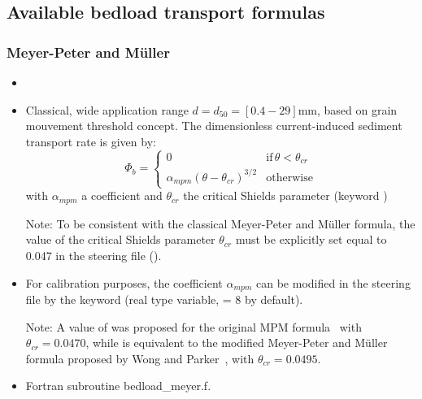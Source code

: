 \subsection{Available bedload transport formulas}
\subsubsection{Meyer-Peter and M\"uller}
\begin{itemize}
\item {}
\item Classical, wide application range $d=d_{50} = [0.4-29]$mm, based on grain mouvement threshold concept. The dimensionless current-induced sediment transport rate is given by:
\begin{equation*}
\Phi_b=\left\{\begin{array}{ll}
0 & \text{if}\,\theta<\theta_{cr}\\
\alpha_{mpm}(\theta-\theta_{cr})^{3/2} & \text{otherwise}
\end{array}
\right.
\end{equation*}
with $\alpha_{mpm}$ a coefficient and $\theta_{cr}$ the critical Shields parameter (keyword )

   \begin{WarningBlock}{Note:}
  To be consistent with the classical Meyer-Peter and M\"uller formula, the value of the critical Shields parameter $\theta_{cr}$ must be explicitly set equal to 0.047 in the steering file ().
\end{WarningBlock}

\item For calibration purposes, the coefficient $\alpha_{mpm}$ can be modified in the steering file by the keyword  (real type variable, {\ttfamily = 8} by default).

  \begin{WarningBlock}{Note:}
  A value of  was proposed for the original MPM formula~\cite{GarciaBook2006} with $\theta_{cr}=0.0470$, while  is equivalent to the modified Meyer-Peter and M\"uller formula proposed by Wong and Parker~\cite{WongParker06}, with $\theta_{cr}=0.0495$. 
  \end{WarningBlock}

  
  
\item Fortran subroutine {\ttfamily bedload\_meyer.f}.

\end{itemize}


